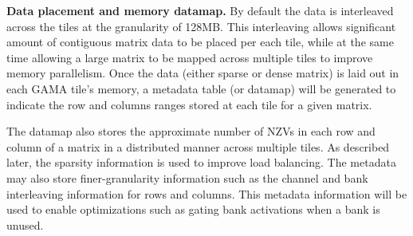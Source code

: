\vspace{3pt}
\noindent
\textbf{Data placement and memory datamap.} 
By default the data is interleaved across the tiles at the granularity of 128MB. 
This interleaving allows significant amount of contiguous matrix data to be placed per each tile, while at the same time allowing a large matrix to be mapped across multiple tiles to improve memory parallelism.   
Once the data (either sparse or dense matrix) is laid out in each GAMA tile's memory, 
a metadata table (or datamap) will be generated to indicate the row and columns ranges stored at each tile for a given matrix.   

The datamap also stores the  approximate number of NZVs in each row and column of a matrix in a distributed manner across multiple tiles. 
As described later, the sparsity information is used to improve load balancing.     
The metadata may also store finer-granularity information such as the channel and bank interleaving information for rows and columns. 
This metadata information will be used to enable optimizations such as gating bank activations 
when a bank is unused.    
%




 
